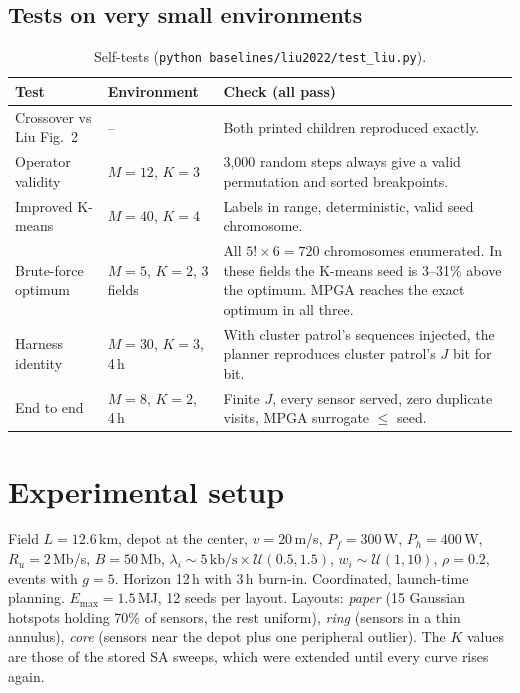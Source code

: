 \documentclass[10pt,a4paper]{article}
\begin{document}
\subsection{Tests on very small environments}\label{sec:tests}
\begin{table}[H]\centering\small
\begin{tabularx}{\linewidth}{>{\raggedright\arraybackslash}p{4.2cm}>{\raggedright\arraybackslash}p{2.6cm}L}
\toprule
Test & Environment & Check (all pass)\\
\midrule
Crossover vs Liu Fig.~2 & -- & Both printed children reproduced exactly.\\
Operator validity & $M=12$, $K=3$ & 3{,}000 random steps always give a valid permutation and sorted breakpoints.\\
Improved K-means & $M=40$, $K=4$ & Labels in range, deterministic, valid seed chromosome.\\
Brute-force optimum & $M=5$, $K=2$, 3 fields & All $5!\times6=720$ chromosomes enumerated. In these fields the K-means seed is 3--31\% above the optimum. MPGA reaches the exact optimum in all three.\\
Harness identity & $M=30$, $K=3$, 4\,h & With cluster patrol's sequences injected, the planner reproduces cluster patrol's $J$ bit for bit.\\
End to end & $M=8$, $K=2$, 4\,h & Finite $J$, every sensor served, zero duplicate visits, MPGA surrogate $\le$ seed.\\
\bottomrule
\end{tabularx}
\caption{Self-tests (\texttt{python baselines/liu2022/test\_liu.py}).}
\end{table}

\section{Experimental setup}
Field $L=12.6$\,km, depot at the center, $v=20$\,m/s, $P_f=300$\,W, $P_h=400$\,W, $R_u=2$\,Mb/s,
$B=50$\,Mb, $\lambda_i\sim 5\,\text{kb/s}\times\mathcal U(0.5,1.5)$, $w_i\sim\mathcal U(1,10)$, $\rho=0.2$, events
with $g=5$. Horizon 12\,h with 3\,h burn-in. Coordinated, launch-time planning. $E_{\max}=1.5$\,MJ, 12 seeds
per layout. Layouts: \emph{paper} (15 Gaussian hotspots holding 70\% of sensors, the rest uniform),
\emph{ring} (sensors in a thin annulus), \emph{core} (sensors near the depot plus one peripheral outlier).
The $K$ values are those of the stored SA sweeps, which were extended until every curve rises again.
\end{document}
